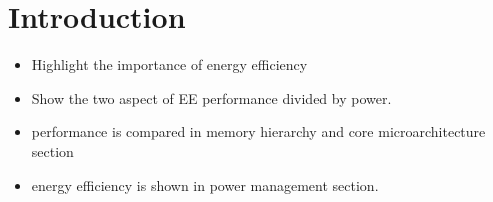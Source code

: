 \chapter{Introduction}
\label{sec:introduction}

\begin{itemize}
    \item Highlight the importance of energy efficiency
    \item Show the two aspect of EE performance divided by power.
    \item performance is compared in memory hierarchy and core microarchitecture section
    \item energy efficiency is shown in power management section.
\end{itemize}